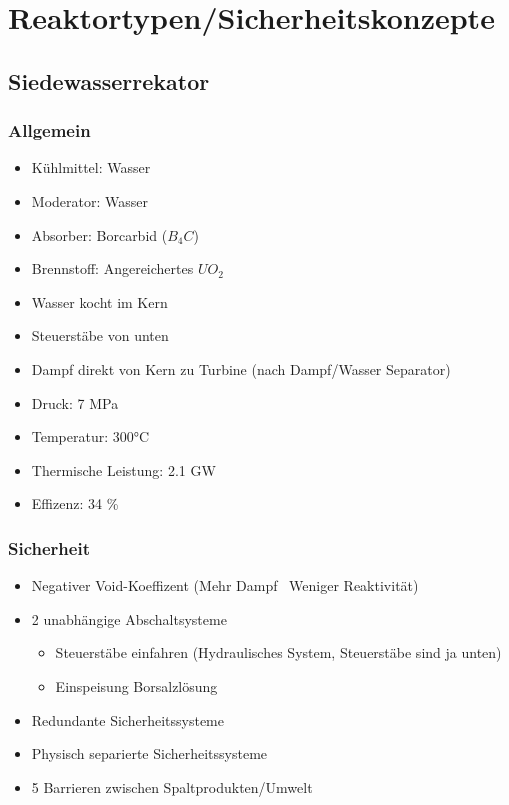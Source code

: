 \documentclass[12pt]{article}
\begin{document}
\thispagestyle{empty}

\section{Reaktortypen/Sicherheitskonzepte}

\subsection{Siedewasserrekator}

\subsubsection{Allgemein}
\begin{itemize}
	\item Kühlmittel: Wasser
	\item Moderator: Wasser
	\item Absorber: Borcarbid (\(B_4C\))
	\item Brennstoff: Angereichertes \(UO_2\)
	\item Wasser kocht im Kern
	\item Steuerstäbe von unten
	\item Dampf direkt von Kern zu Turbine (nach Dampf/Wasser Separator)
	\item Druck: 7 MPa
	\item Temperatur: 300°C
	\item Thermische Leistung: 2.1 GW
	\item Effizenz: 34 \%
\end{itemize}

\subsubsection{Sicherheit}
\begin{itemize}
	\item Negativer Void-Koeffizent (Mehr Dampf \textrightarrow\ Weniger Reaktivität)
	\item 2 unabhängige Abschaltsysteme
		\begin{itemize}
			\item Steuerstäbe einfahren (Hydraulisches System, Steuerstäbe sind ja unten)
			\item Einspeisung Borsalzlösung
		\end{itemize}
	\item Redundante Sicherheitssysteme
	\item Physisch separierte Sicherheitssysteme
	\item 5 Barrieren zwischen Spaltprodukten/Umwelt
\end{itemize}
\end{document}
